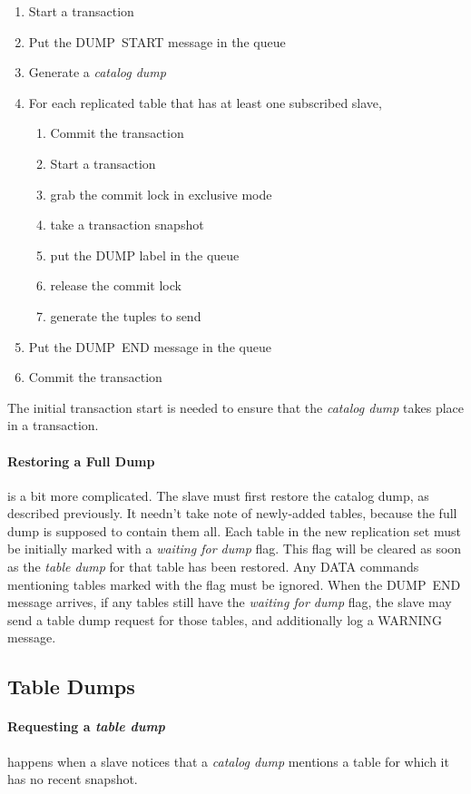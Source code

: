 \documentclass{article}
\newcommand{\catdump}{\emph{catalog dump}}
\newcommand{\tabdump}{\emph{table dump}}
\begin{document}
\begin{enumerate}
\item Start a transaction
\item Put the DUMP~START message in the queue
\item Generate a \catdump
\item For each replicated table that has at least one subscribed slave,
\begin{enumerate}
 \item Commit the transaction
 \item Start a transaction
 \item grab the commit lock in exclusive mode
 \item take a transaction snapshot
 \item put the DUMP label in the queue
 \item release the commit lock
 \item generate the tuples to send
\end{enumerate}
\item Put the DUMP~END message in the queue
\item Commit the transaction
\end{enumerate}

The initial transaction start is needed to ensure that the \catdump{}
takes place in a transaction.

\paragraph{Restoring a Full Dump} is a bit more complicated.
The slave must first restore the catalog dump,
as described previously.
It needn't
take note of newly-added tables,
because the full dump is supposed to contain them all.
Each table in the new replication set
must be initially marked with a \emph{waiting for dump} flag.
This flag will be cleared as soon as the \tabdump{}
for that table has been restored.
Any DATA commands mentioning tables marked with the flag must be ignored.
When the DUMP~END message arrives,
if any tables still have the \emph{waiting for dump} flag,
the slave may send a table dump request for those tables,
and additionally log a WARNING message.

\subsection{Table Dumps}

\paragraph{Requesting a \tabdump} \label{sec:request} happens when a slave
notices that a \catdump{} mentions a table for which
it has no recent snapshot.
\end{document}
